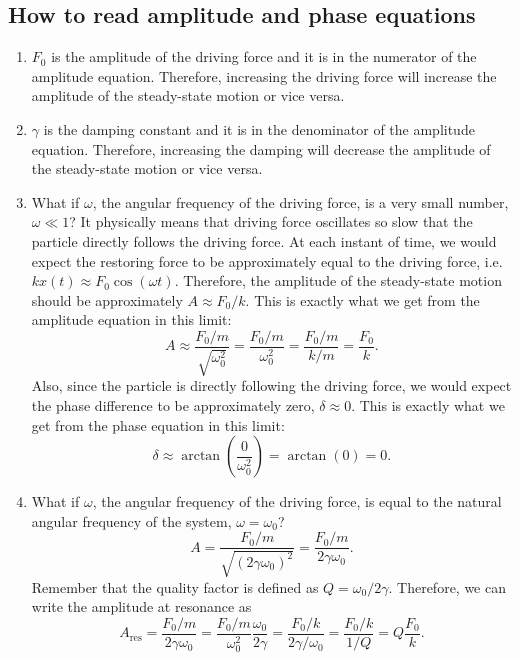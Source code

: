 \documentclass[12pt]{article}
\begin{document}
\subsection{How to read amplitude and phase equations}
\begin{enumerate}
    \item[(a)] $F_0$ is the amplitude of the driving force and it is in the numerator of the amplitude equation. Therefore, increasing the driving force will increase the amplitude of the steady-state motion or vice versa.
    \item[(b)] $\gamma$ is the damping constant and it is in the denominator of the amplitude equation. Therefore, increasing the damping will decrease the amplitude of the steady-state motion or vice versa.
    \item[(c)] What if $\omega$, the angular frequency of the driving force, is a very small number, $\omega \ll 1$? It physically means that driving force oscillates so slow that the particle directly follows the driving force. At each instant of time, we would expect the restoring force to be approximately equal to the driving force, i.e. $kx(t)\approx F_0\cos(\omega t)$. Therefore, the amplitude of the steady-state motion should be approximately $A\approx F_0/k$. This is exactly what we get from the amplitude equation in this limit:
    \begin{equation}
        A\approx\frac{F_0/m}{\sqrt{\omega_0^2}}=\frac{F_0/m}{\omega_0^2}=\frac{F_0/m}{k/m}=\frac{F_0}{k}.
    \end{equation}
    Also, since the particle is directly following the driving force, we would expect the phase difference to be approximately zero, $\delta\approx 0$. This is exactly what we get from the phase equation in this limit:
    \begin{equation}
        \delta\approx\arctan\left(\frac{0}{\omega_0^2}\right)=\arctan(0)=0.
    \end{equation}
    \item[(d)] What if $\omega$, the angular frequency of the driving force, is equal to the natural angular frequency of the system, $\omega=\omega_0$? 
    \begin{equation}
        A=\frac{F_0/m}{\sqrt{(2\gamma\omega_0)^2}}=\frac{F_0/m}{2\gamma\omega_0}.
    \end{equation}
    Remember that the quality factor is defined as $Q=\omega_0/2\gamma$. Therefore, we can write the amplitude at resonance as
    \begin{equation}
        A_\text{res}=\frac{F_0/m}{2\gamma\omega_0}=\frac{F_0/m}{\omega_0^2}\frac{\omega_0}{2\gamma}=\frac{F_0/k}{2\gamma/\omega_0}=\frac{F_0/k}{1/Q}=Q\frac{F_0}{k}.

\end{equation}
\end{enumerate}
\end{document}
